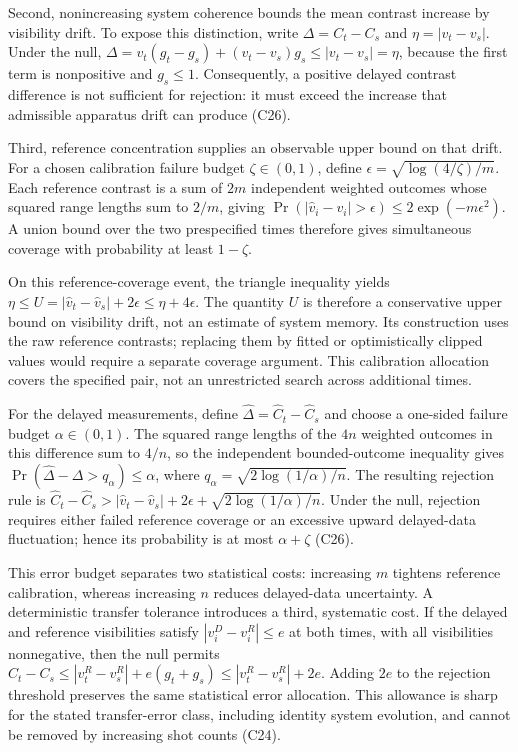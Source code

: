\documentclass[11pt]{article}
\begin{document}
Second, nonincreasing system coherence bounds the mean contrast increase by visibility drift. To expose this distinction, write $\Delta=C_t-C_s$ and $\eta=|v_t-v_s|$. Under the null, $\Delta=v_t(g_t-g_s)+(v_t-v_s)g_s\leq|v_t-v_s|=\eta$, because the first term is nonpositive and $g_s\leq1$. Consequently, a positive delayed contrast difference is not sufficient for rejection: it must exceed the increase that admissible apparatus drift can produce (C26).

Third, reference concentration supplies an observable upper bound on that drift. For a chosen calibration failure budget $\zeta\in(0,1)$, define $\epsilon=\sqrt{\log(4/\zeta)/m}$. Each reference contrast is a sum of $2m$ independent weighted outcomes whose squared range lengths sum to $2/m$, giving $\Pr(|\widehat v_i-v_i|>\epsilon)\leq2\exp(-m\epsilon^2)$. A union bound over the two prespecified times therefore gives simultaneous coverage with probability at least $1-\zeta$.

On this reference-coverage event, the triangle inequality yields $\eta\leq U=|\widehat v_t-\widehat v_s|+2\epsilon\leq\eta+4\epsilon$. The quantity $U$ is therefore a conservative upper bound on visibility drift, not an estimate of system memory. Its construction uses the raw reference contrasts; replacing them by fitted or optimistically clipped values would require a separate coverage argument. This calibration allocation covers the specified pair, not an unrestricted search across additional times.

For the delayed measurements, define $\widehat\Delta=\widehat C_t-\widehat C_s$ and choose a one-sided failure budget $\alpha\in(0,1)$. The squared range lengths of the $4n$ weighted outcomes in this difference sum to $4/n$, so the independent bounded-outcome inequality gives $\Pr(\widehat\Delta-\Delta>q_\alpha)\leq\alpha$, where $q_\alpha=\sqrt{2\log(1/\alpha)/n}$. The resulting rejection rule is $\widehat C_t-\widehat C_s>|\widehat v_t-\widehat v_s|+2\epsilon+\sqrt{2\log(1/\alpha)/n}$. Under the null, rejection requires either failed reference coverage or an excessive upward delayed-data fluctuation; hence its probability is at most $\alpha+\zeta$ (C26).

This error budget separates two statistical costs: increasing $m$ tightens reference calibration, whereas increasing $n$ reduces delayed-data uncertainty. A deterministic transfer tolerance introduces a third, systematic cost. If the delayed and reference visibilities satisfy $|v_i^{D}-v_i^{R}|\leq e$ at both times, with all visibilities nonnegative, then the null permits $C_t-C_s\leq|v_t^{R}-v_s^{R}|+e(g_t+g_s)\leq|v_t^{R}-v_s^{R}|+2e$. Adding $2e$ to the rejection threshold preserves the same statistical error allocation. This allowance is sharp for the stated transfer-error class, including identity system evolution, and cannot be removed by increasing shot counts (C24).
\end{document}
